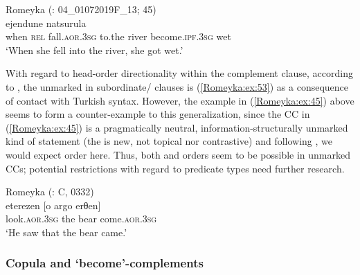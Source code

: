 \documentclass[output=paper,colorlinks,citecolor=brown]{langscibook}
\begin{document}
\ea\label{Romeyka:ex:52}
Romeyka (\citealt{schreiber_inprep}: 04\_01072019F\_13; 45) \\
 ejendune natsurula \\
when \textsc{rel} fall\textsc{.aor.3sg} to.the river become\textsc{.ipf.3sg} wet \\
\glt `When she fell into the river, she got wet.'  \\
\z

\begin{sloppypar}
With regard to head-order directionality within the complement clause, according to \citet[118]{neocleous_word_2020}, the unmarked  in subordinate/ clauses is  (\ref{Romeyka:ex:53}) as a consequence of contact with Turkish  syntax. However, the example in (\ref{Romeyka:ex:45}) above seems to form a counter-example to this generalization, since the CC in (\ref{Romeyka:ex:45}) is a pragmatically neutral, information-structurally unmarked kind of statement (the  is new, not topical nor contrastive) and following \citet{neocleous_word_2020}, we would expect  order here. Thus, both  and  orders seem to be possible in unmarked CCs; potential restrictions with regard to predicate types need further research.
\end{sloppypar}

\ea\label{Romeyka:ex:53}
Romeyka (\citealt{schreiber2021pontic}: C, 0332) \\
\gll eterezen [o argo erθen] \\
look\textsc{.aor.3sg} the bear come\textsc{.aor.3sg} \\
\glt `He saw that the bear came.'  \\
\z

\subsubsection{Copula and `become'-complements}\label{Romeyka:ss:4.7.2}
\end{document}
